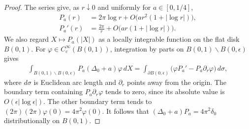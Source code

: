 \documentclass[a4paper,11pt,oneside,reqno]{amsart}
\numberwithin{equation}{section}
\theoremstyle{definition}
\begin{document}
\begin{proof}
    The series give, as $r\downarrow0$ and uniformly for
    $a\in[0,1/4]$,
    \begin{align*}
        P_a(r)&=2\pi\log r+O\bigl(ar^2(1+|\log r|)\bigr),\\
        P_a'(r)&=\frac{2\pi}{r}
            +O\bigl(ar(1+|\log r|)\bigr).
    \end{align*}
    We also regard $X\mapsto P_a(|X|)$ as a locally
    integrable function on the flat disk $B(0,1)$.
    For $\varphi\in C_c^\infty(B(0,1))$, integration by
    parts on $B(0,1)\smallsetminus B(0,\epsilon)$ gives
    \begin{align*}
        \int_{B(0,1)\smallsetminus B(0,\epsilon)}
        P_a(\Delta_0+a)\varphi\,dX
        =\int_{\partial B(0,\epsilon)}
        \bigl(\varphi P_a'-P_a\partial_r\varphi\bigr)\,d\sigma,
    \end{align*}
    where $d\sigma$ is Euclidean arc length and
    $\partial_r$ points away from the origin. The boundary
    term containing $P_a\partial_r\varphi$ tends to zero,
    since its absolute value is $O(\epsilon|\log\epsilon|)$.
    The other boundary term tends to
    $(2\pi)(2\pi)\varphi(0)=4\pi^2\varphi(0)$.
    It follows that $(\Delta_0+a)P_a=4\pi^2\delta_0$
    distributionally on $B(0,1)$.


\end{proof}
\end{document}
